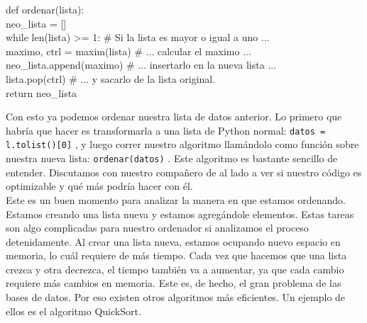 \documentclass[10pt,letterpaper]{article}
\newcommand{\inlinecode}[1]{
\colorbox{light-gray}{\texttt{#1}}
}
\newenvironment{Code}
{
\begin{lrbox}{\selvestebox}%
\begin{minipage}{\dimexpr\columnwidth-2\fboxsep\relax}
\fontfamily{\ttdefault}\selectfont
}
{\end{minipage}\end{lrbox}%
\begin{center}
\colorbox{light-gray}{\usebox{\selvestebox}}
\end{center}
}
\begin{document}
\begin{footnotesize}
\begin{Code}
def ordenar(lista):\\
\hspace*{5mm} neo\_lista = []\\
\hspace*{5mm} while len(lista) >= 1: \# Si la lista es mayor o igual a uno ...\\
\hspace*{11mm} maximo, ctrl = maxim(lista) \# ... calcular el maximo ...\\
\hspace*{11mm} neo\_lista.append(maximo) \# ... insertarlo en la nueva lista ...\\
\hspace*{11mm} lista.pop(ctrl) \# ... y sacarlo de la lista original.\\
\hspace*{5mm} return neo\_lista
\end{Code}
\end{footnotesize}

Con esto ya podemos ordenar nuestra lista de datos anterior. Lo primero que habr\'ia que hacer es transformarla a una lista de Python normal: \inlinecode{datos = l.tolist()[0]}, y luego correr nuestro algoritmo llam\'andolo como funci\'on sobre nuestra nueva lista: \inlinecode{ordenar(datos)}. Este algoritmo es bastante sencillo de entender. Discutamos con nuestro compa\~nero de al lado a ver si nuestro c\'odigo es optimizable y qu\'e m\'as podr\'ia hacer con \'el.\\

Este es un buen momento para analizar la manera en que estamos ordenando. Estamos creando una lista nueva y estamos agreg\'andole elementos. Estas tareas son algo complicadas para nuestro ordenador si analizamos el proceso detenidamente. Al crear una lista nueva, estamos ocupando nuevo espacio en memoria, lo cu\'al requiere de m\'as tiempo. Cada vez que hacemos que una lista crezca y otra decrezca, el tiempo tambi\'en va a aumentar, ya que cada cambio requiere m\'as cambios en memoria. Este es, de hecho, el gran problema de las bases de datos. Por eso existen otros algoritmos m\'as eficientes. Un ejemplo de ellos es el algoritmo QuickSort.
\end{document}
